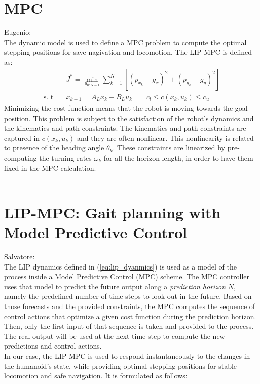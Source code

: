 \section{MPC}
Eugenio: \\
The dynamic model is used to define a MPC problem to compute the optimal stepping positions for save nagivation and locomotion. The LIP-MPC is defined as:
\begin{align*}
    &J^* = \min_{u_{0:N-1}} \sum_{k=1}^{N}[(p_{x_{k}} - g_{x})^2+(p_{y_{k}} - g_{y})^2]
    \\ \text{s. t} \quad
    &x_{k+1} = A_{L}x_{k} + B_{L}u_{k} \qquad
    c_{l} \le c(x_{k}, u_{k}) \le c_{u}
\end{align*}
Minimizing the cost function means that the robot is moving towards the goal position. This problem is subject to the satisfaction of the robot's dynamics and the kinematics and path constraints. The kinematics and path constraints are captured in $c(x_{k}, u_{k})$ and they are often nonlinear. This nonlinearity is related to presence of the heading angle $\theta_{k}$. These constraints are linearized by pre-computing the turning rates $\bar{\omega}_{k}$ for all the horizon length, in order to have them fixed in the MPC calculation.
\\
\\

\section{LIP-MPC: Gait planning with Model Predictive Control}\label{sec:mpc}
Salvatore:\\
The LIP dynamics defined in (\ref{eq:lip_dyanmics}) is used as a model of the process inside a Model Predictive Control (MPC) scheme. The MPC controller uses that model to predict the future output along a \textit{prediction horizon} $N$, namely the predefined number of time steps to look out in the future. Based on those forecasts and the provided constraints, the MPC computes the sequence of control actions that optimize a given cost function during the prediction horizon. Then, only the first input of that sequence is taken and provided to the process. The real output will be used at the next time step to compute the new predictions and control actions.\\
 In our case, the LIP-MPC is used to respond instantaneously to the changes in the humanoid's state, while providing optimal stepping positions for stable locomotion and safe navigation. It is formulated as follows:

